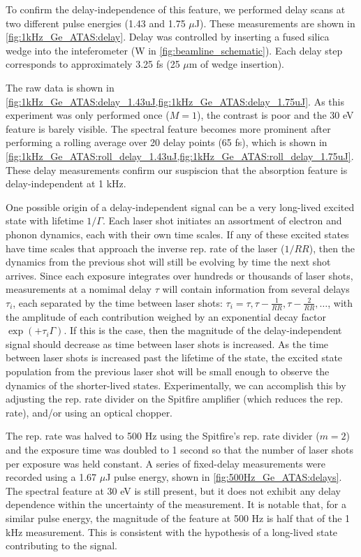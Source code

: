 To confirm the delay-independence of this feature, we performed delay scans at two different pulse energies (1.43 and 1.75 $\mu$J). These measurements are shown in \cref{fig:1kHz_Ge_ATAS:delay}. Delay was controlled by inserting a fused silica wedge into the inteferometer (W in \cref{fig:beamline_schematic}). Each delay step corresponds to approximately 3.25 fs (25 $\mu$m of wedge insertion).

The raw data is shown in \cref{fig:1kHz_Ge_ATAS:delay_1.43uJ,fig:1kHz_Ge_ATAS:delay_1.75uJ}. As this experiment was only performed once ($M=1$), the contrast is poor and the 30 eV feature is barely visible. The spectral feature becomes more prominent after performing a rolling average over 20 delay points (65 fs), which is shown in \cref{fig:1kHz_Ge_ATAS:roll_delay_1.43uJ,fig:1kHz_Ge_ATAS:roll_delay_1.75uJ}. These delay measurements confirm our suspiscion that the absorption feature is delay-independent at 1 kHz.

One possible origin of a delay-independent signal can be a very long-lived excited state with lifetime $1/\Gamma$. Each laser shot initiates an assortment of electron and phonon dynamics, each with their own time scales. If any of these excited states have time scales that approach the inverse rep. rate of the laser ($1/RR$), then the dynamics from the previous shot will still be evolving by time the next shot arrives. Since each exposure integrates over hundreds or thousands of laser shots, measurements at a nomimal delay $\tau$ will contain information from several delays $\tau_i$, each separated by the time between laser shots: $\tau_i = \tau, \tau-\frac{1}{RR}, \tau-\frac{2}{RR}, \dots$, with the amplitude of each contribution weighed by an exponential decay factor $\exp(+ \tau_i \Gamma)$. If this is the case, then the magnitude of the delay-independent signal should decrease as time between laser shots is increased. As the time between laser shots is increased past the lifetime of the state, the excited state population from the previous laser shot will be small enough to observe the dynamics of the shorter-lived states. Experimentally, we can accomplish this by adjusting the rep. rate divider on the Spitfire amplifier (which reduces the rep. rate), and/or using an optical chopper.

The rep. rate was halved to 500 Hz using the Spitfire's rep. rate divider ($m=2$) and the exposure time was doubled to 1 second so that the number of laser shots per exposure was held constant. A series of fixed-delay measurements were recorded using a 1.67 $\mu$J pulse energy, shown in \cref{fig:500Hz_Ge_ATAS:delays}. The spectral feature at 30 eV is still present, but it does not exhibit any delay dependence within the uncertainty of the measurement. It is notable that, for a similar pulse energy, the magnitude of the feature at 500 Hz is half that of the 1 kHz measurement. This is consistent with the hypothesis of a long-lived state contributing to the signal.

